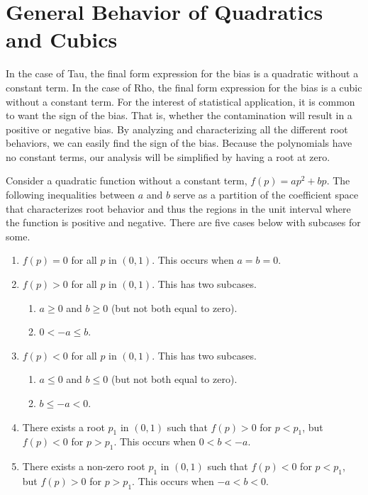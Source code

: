 \section{General Behavior of Quadratics and Cubics}
\hspace{24pt} In the case of Tau, the final form expression for the bias is a quadratic without a constant term. In the case of Rho, the final form expression for the bias is a cubic without a constant term. For the interest of statistical application, it is common to want the sign of the bias. That is, whether the contamination will result in a positive or negative bias. By analyzing and characterizing all the different root behaviors, we can easily find the sign of the bias. Because the polynomials have no constant terms, our analysis will be simplified by having a root at zero.
\begin{prop}
    Consider a quadratic function without a constant term, $f(p)=ap^2+bp$. The following inequalities between $a$ and $b$ serve as a partition of the coefficient space that characterizes root behavior and thus the regions in the unit interval where the function is positive and negative. There are five cases below with subcases for some.
    \begin{enumerate}
        \item $f(p)=0$ for all $p$ in $(0,1)$. This occurs when $a=b=0$.
        \item $f(p)>0$ for all $p$ in $(0,1)$. This has two subcases.
        \begin{enumerate}
            \item $a\geq 0$ and $b\geq 0$ (but not both equal to zero).
            \item $0<-a\leq b$.
        \end{enumerate}
        \item $f(p)<0$ for all $p$ in $(0,1)$. This has two subcases.
        \begin{enumerate}
            \item $a\leq 0$ and $b\leq 0$ (but not both equal to zero).
            \item $b\leq -a<0$.
        \end{enumerate}
        \item There exists a root $p_1$ in $(0,1)$ such that $f(p)>0$ for $p<p_1$, but $f(p)<0$ for $p>p_1$.  This occurs when $0 < b < -a$. 
        \item There exists a non-zero root $p_1$ in $(0,1)$ such that $f(p) < 0$ for $p < p_1$, but $f(p) > 0$ for $p > p_1$.  This occurs when $-a < b < 0$.

\end{enumerate}
\end{prop}

